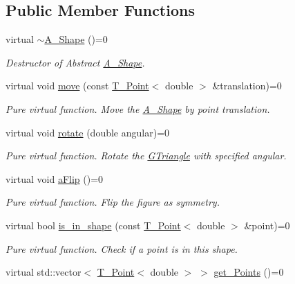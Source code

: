 \subsection*{Public Member Functions}
\begin{DoxyCompactItemize}
\item 
\mbox{\label{classShape_a39fe45638d872f0ce9670d7f85290161}} 
virtual \hyperlink{classShape_a39fe45638d872f0ce9670d7f85290161}{$\sim$\+A_Shape} ()=0
\begin{DoxyCompactList}\small\item\em Destructor of Abstract \hyperlink{classShape}{A_Shape}. \end{DoxyCompactList}\item
virtual void \hyperlink{classShape_a1f447acd6219cb10b9b7a40371519c46}{move} (const \hyperlink{classPoint}{T_Point}$<$ double $>$ \&translation)=0
\begin{DoxyCompactList}\small\item\em Pure virtual function. Move the \hyperlink{classShape}{A_Shape} by point translation. \end{DoxyCompactList}\item
virtual void \hyperlink{classShape_a2dea8616fd40f2d69fd208715921982a}{rotate} (double angular)=0
\begin{DoxyCompactList}\small\item\em Pure virtual function. Rotate the \hyperlink{classGTriangle}{G\+Triangle} with specified angular. \end{DoxyCompactList}\item 
\mbox{\label{classShape_a5a1607f7dc4908225f97aeadb449636d}} 
virtual void \hyperlink{classShape_a5a1607f7dc4908225f97aeadb449636d}{aFlip} ()=0
\begin{DoxyCompactList}\small\item\em Pure virtual function. Flip the figure as symmetry. \end{DoxyCompactList}\item 
virtual bool \hyperlink{classShape_aa09a621da090e42840b4bec7ffb27620}{is\+\_\+in\+\_\+shape} (const \hyperlink{classPoint}{T_Point}$<$ double $>$ \&point)=0
\begin{DoxyCompactList}\small\item\em Pure virtual function. Check if a point is in this shape. \end{DoxyCompactList}\item 
virtual std\+::vector$<$ \hyperlink{classPoint}{T_Point}$<$ double $>$ $>$ \hyperlink{classShape_add74a5c682840fa4a519242b1ddbd0b5}{get\+\_\+\+Points} ()=0

\end{DoxyCompactItemize}
